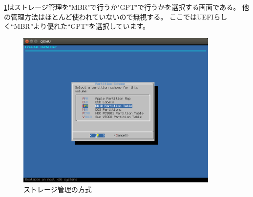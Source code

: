 \documentclass[a4j]{jarticle}
\begin{document}
\begin{multicols}{2}
\ref{fig:FreeBSD_GPT}はストレージ管理を"MBR"で行うか"GPT"で行うかを選択する画面である。
他の管理方法はほとんど使われていないので無視する。
ここではUEFIらしく``MBR''より優れた``GPT''を選択しています。
\begin{figure}[htbp]
	\begin{center}
    	\includegraphics[width=10cm]{./IMG/FreeBSD_GPT.png}
	\end{center}
    \caption{ストレージ管理の方式}
    \label{fig:FreeBSD_GPT}
\end{figure}


\end{multicols}
\end{document}

